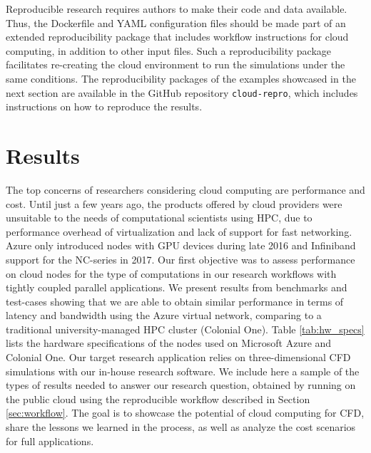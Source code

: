 \documentclass[10pt,journal,compsoc]{IEEEtran}
\begin{document}
Reproducible research requires authors to make their code and data available.
Thus, the Dockerfile and YAML configuration files should be made part of an extended reproducibility package that includes workflow instructions for cloud computing, in addition to other input files.
Such a reproducibility package facilitates re-creating the cloud environment to run the simulations under the same conditions.
The reproducibility packages of the examples showcased in the next section are available in the GitHub repository \texttt{cloud-repro}, which includes instructions on how to reproduce the results.



\section{Results}\label{sec:results}

The top concerns of researchers considering cloud computing are performance and cost. 
Until just a few years ago, the products offered by cloud providers were unsuitable to the needs of computational scientists using HPC, due to performance overhead of virtualization and lack of support for fast networking. 
Azure only introduced nodes with GPU devices during late 2016 and Infiniband support for the NC-series in 2017.
Our first objective was to assess performance on cloud nodes for the type of computations in our research workflows with  tightly coupled parallel applications. 
We present results from benchmarks and test-cases showing that we are able to obtain similar performance in terms of latency and bandwidth using the Azure virtual network, comparing to a traditional university-managed HPC cluster (Colonial One).
Table \ref{tab:hw_specs} lists the hardware specifications of the nodes used on Microsoft Azure and Colonial One.
Our target research application relies on three-dimensional CFD simulations with our in-house research software. We include here a sample of the types of results needed to answer our research question, obtained by running on the public cloud using the reproducible workflow described in Section \ref{sec:workflow}.
The goal is to showcase the potential of cloud computing for CFD, share the lessons we learned in the process, as well as analyze the cost scenarios for full applications.
\end{document}
